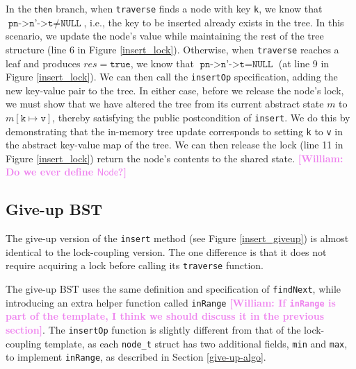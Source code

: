 \documentclass[a4paper,UKenglish,cleveref, autoref, thm-restate]{lipics-v2021}
\newcommand{\treerep}{\ensuremath{\mathsf{Node}}}
\newcommand{\wm}[1]{\textbf{\textcolor{violet}{[William: #1]}}}
\begin{document}
In the $\mathsf{then}$ branch, when \texttt{traverse} finds a node with key \lstinline{k}, %
we know that $\texttt{pn->n'->t} \neq \texttt{NULL}$, i.e., the key to be inserted already exists in the tree. In this scenario, we update the node's value while maintaining the rest of the tree structure (line 6 in Figure \ref{insert_lock}). Otherwise, when \texttt{traverse} reaches a leaf and produces $\mathit{res} = \texttt{true}$, we know that $\texttt{pn->n'->t} = \texttt{NULL}$ (at line 9 in Figure \ref{insert_lock}). We can then call the \texttt{insertOp} specification, adding the new key-value pair to the tree. In either case, before we release the node's lock, we must show that we have altered the tree from its current abstract state $m$ to $m[\texttt{k} \mapsto \texttt{v}]$, thereby satisfying the public postcondition of \lstinline{insert}. We do this by demonstrating that the in-memory tree update corresponds to setting \lstinline{k} to \lstinline{v} in the abstract key-value map of the tree. 
We can then release the lock (line 11 in Figure \ref{insert_lock}) return the node's contents to the shared state. %
\wm{Do we ever define $\treerep$?}

\subsection{Give-up BST}
\label{BST_giveup_insert}
The give-up version of the \texttt{insert} method (see Figure \ref{insert_giveup}) is almost identical to the lock-coupling version. The one difference is that it does not require acquiring a lock before calling its \texttt{traverse} function. 

The give-up BST uses the same definition and specification of \texttt{findNext}, while introducing an extra helper function called \texttt{inRange} \wm{If \lstinline{inRange} is part of the template, I think we should discuss it in the previous section}. The \texttt{insertOp} function is slightly different from that of the lock-coupling template, as each \lstinline{node_t} struct has two additional fields, \texttt{min} and \texttt{max}, to implement \lstinline{inRange}, as described in Section \ref{give-up-algo}.
\end{document}
